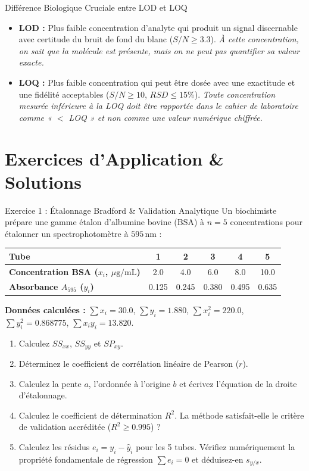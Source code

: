 \documentclass[11pt,a4paper]{article}
\begin{document}
\begin{biobox}{Différence Biologique Cruciale entre LOD et LOQ}
\begin{itemize}[leftmargin=*, label=\faAngleRight]
  \item \textbf{LOD :} Plus faible concentration d'analyte qui produit un signal discernable avec certitude du bruit de fond du blanc ($S/N \ge 3.3$). \textit{À cette concentration, on sait que la molécule est présente, mais on ne peut pas quantifier sa valeur exacte.}
  \item \textbf{LOQ :} Plus faible concentration qui peut être dosée avec une exactitude et une fidélité acceptables ($S/N \ge 10$, $RSD \le 15\%$). \textit{Toute concentration mesurée inférieure à la LOQ doit être rapportée dans le cahier de laboratoire comme « $<$ LOQ » et non comme une valeur numérique chiffrée.}
\end{itemize}
\end{biobox}

\section{Exercices d'Application \& Solutions}

\begin{exercicebox}{Exercice 1 : Étalonnage Bradford \& Validation Analytique}
Un biochimiste prépare une gamme étalon d'albumine bovine (BSA) à $n = 5$ concentrations pour étalonner un spectrophotomètre à $595\,\text{nm}$ :
\begin{center}
\small
\begin{tabular}{lccccc}
\toprule
\textbf{Tube} & 1 & 2 & 3 & 4 & 5 \\
\midrule
\textbf{Concentration BSA ($x_i$, $\mu\text{g/mL}$)} & 2.0 & 4.0 & 6.0 & 8.0 & 10.0 \\
\textbf{Absorbance $A_{595}$ ($y_i$)} & 0.125 & 0.245 & 0.380 & 0.495 & 0.635 \\
\bottomrule
\end{tabular}
\end{center}
\textbf{Données calculées :} $\sum x_i = 30.0$, $\sum y_i = 1.880$, $\sum x_i^2 = 220.0$, $\sum y_i^2 = 0.868775$, $\sum x_i y_i = 13.820$.
\begin{enumerate}[label=\textbf{\alph*.}]
  \item Calculez $SS_{xx}$, $SS_{yy}$ et $SP_{xy}$.
  \item Déterminez le coefficient de corrélation linéaire de Pearson ($r$).
  \item Calculez la pente $a$, l'ordonnée à l'origine $b$ et écrivez l'équation de la droite d'étalonnage.
  \item Calculez le coefficient de détermination $R^2$. La méthode satisfait-elle le critère de validation accréditée ($R^2 \ge 0.995$) ?
  \item Calculez les résidus $e_i = y_i - \hat{y}_i$ pour les 5 tubes. Vérifiez numériquement la propriété fondamentale de régression $\sum e_i = 0$ et déduisez-en $s_{y/x}$.
\end{enumerate}
\end{exercicebox}
\end{document}
